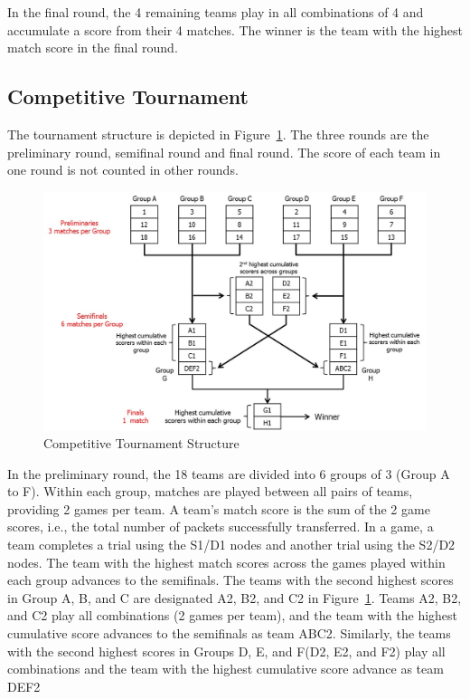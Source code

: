 In the final round, the 4 remaining teams play in all combinations of 4 and accumulate a score from their 4 matches. The winner is the team with the highest match score in the final round.


\subsection{Competitive Tournament}
The tournament structure is depicted in Figure~\ref{fig:CompetitiveTournamentStructure}. The three rounds are the preliminary round, semifinal round and final round. The score of each team in one round is not counted in other rounds.
\begin{figure}[tpb]
  \begin{center}
    \centerline{\includegraphics[width=170mm]{CompetitiveTournamentStructure.jpg}}
    \caption{Competitive Tournament Structure}
    \label{fig:CompetitiveTournamentStructure}
  \end{center}
\end{figure}

In the preliminary round, the 18 teams are divided into 6 groups of 3 (Group A to F). Within each group, matches are played between all pairs of teams, providing 2 games per team. A team's match score is the sum of the 2 game scores, i.e., the total number of packets successfully transferred. In a game, a team completes a trial using the S1/D1 nodes and another trial using the S2/D2 nodes. The team with the highest match scores across the games played within each group advances to the semifinals. The teams with the second highest scores in Group A, B, and C are designated A2, B2, and C2 in Figure~\ref{fig:CompetitiveTournamentStructure}. Teams A2, B2, and C2 play all combinations (2 games per team), and the team with the highest cumulative score advances to the semifinals as team ABC2. Similarly, the teams with the second highest scores in Groups D, E, and F(D2, E2, and F2) play all combinations and the team with the highest cumulative score advance as team DEF2

